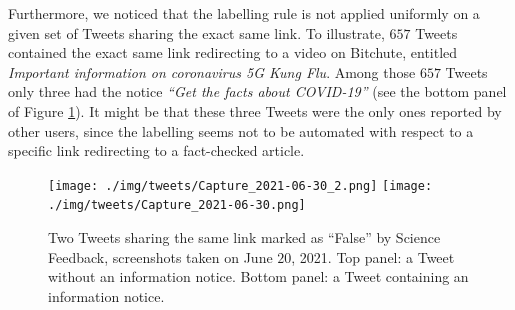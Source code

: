 \documentclass[Afour,sageh,times]{sagej}
\begin{document}
Furthermore, we noticed that the labelling rule is not applied uniformly on a given set of Tweets sharing the exact same link. To illustrate, $657$ Tweets contained the exact same link redirecting to a video on Bitchute, entitled {\it Important information on coronavirus 5G Kung Flu}. 
Among those $657$ Tweets only three had the notice {\it ``Get the facts about COVID-19''} (see the bottom panel of Figure \ref{fig8}).
It might be that these three Tweets were the only ones reported by other users, since the labelling seems not to be automated with respect to a specific link redirecting to a fact-checked article. 
\begin{figure}[h]
\centering
		\texttt{[image: ./img/tweets/Capture\_2021-06-30\_2.png]}
		\texttt{[image: ./img/tweets/Capture\_2021-06-30.png]}
	\caption{Two Tweets sharing the same link marked as ``False'' by Science Feedback, screenshots taken on June $20$, 2021. Top panel: a Tweet without an information notice. Bottom panel: a Tweet containing an information notice.}
	\label{fig8}
\end{figure}
\end{document}

